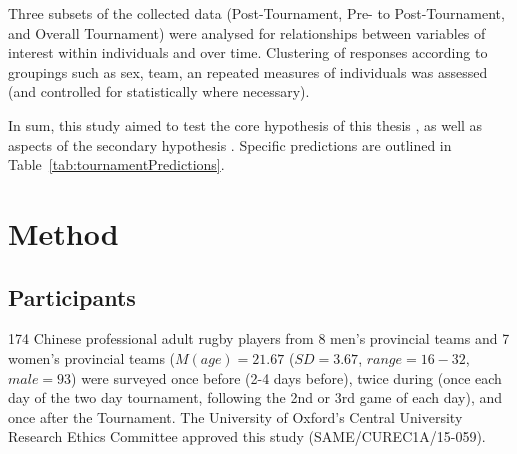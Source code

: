 \begin{CJK}{UTF8}{gbsn}
Three subsets of the collected data (Post-Tournament, Pre- to Post-Tournament, and Overall Tournament) were analysed for relationships between variables of interest within individuals and over time.  Clustering of responses according to groupings such as sex, team, an repeated measures of individuals was assessed (and controlled for statistically where necessary).

In sum, this study aimed to test the core hypothesis of this thesis , as well as aspects of the secondary hypothesis .  Specific predictions are outlined in Table~\ref{tab:tournamentPredictions}.









\clearpage

\section{Method}
\subsection{Participants}
174 Chinese professional adult rugby players from 8 men's provincial teams and 7 women's provincial teams ($M(age) = 21.67$ ($SD = 3.67$, $range = 16 - 32$, $male = 93$) were surveyed once before (2-4 days before), twice during (once each day of the two day tournament, following the 2nd or 3rd game of each day), and once after the Tournament.  The University of Oxford's Central University Research Ethics Committee approved this study (SAME/CUREC1A/15-059).


\end{CJK}
